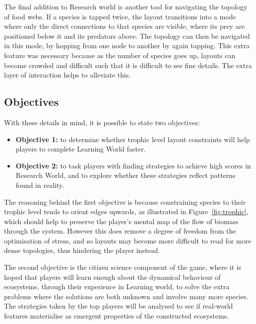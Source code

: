 The final addition to Research world is another tool for navigating the topology of food webs. If a species is tapped twice, the layout transitions into a mode where only the direct connections to that species are visible, where its prey are positioned below it and its predators above. The topology can then be navigated in this mode, by hopping from one node to another by again tapping.
This extra feature was necessary because as the number of species goes up, layouts can become crowded and difficult such that it is difficult to see fine details. The extra layer of interaction helps to alleviate this.

\subsection{Objectives}
With these details in mind, it is possible to state two objectives:
\begin{mdframed}[backgroundcolor=WhiteSmoke]
  \begin{itemize}[leftmargin=*]
    \item \textbf{Objective 1:} to determine whether trophic level layout constraints will help players to complete Learning World faster.
    \item \textbf{Objective 2:} to task players with finding strategies to achieve high scores in Research World, and to explore whether these strategies reflect patterns found in reality.
    \end{itemize}
\end{mdframed}
The reasoning behind the first objective is because constraining species to their trophic level tends to orient edges upwards, as illustrated in Figure~\ref{fig:trophic}, which should help to preserve the player's mental map of the flow of biomass through the system. However this does remove a degree of freedom from the optimisation of stress, and so layouts may become more difficult to read for more dense topologies, thus hindering the player instead.

The second objective is the citizen science component of the game, where it is hoped that players will learn enough about the dynamical behaviour of ecosystems, through their experience in Learning world, to solve the extra problems where the solutions are both unknown and involve many more species.
The strategies taken by the top players will be analysed to see if real-world features materialise as emergent properties of the constructed ecosystems.

